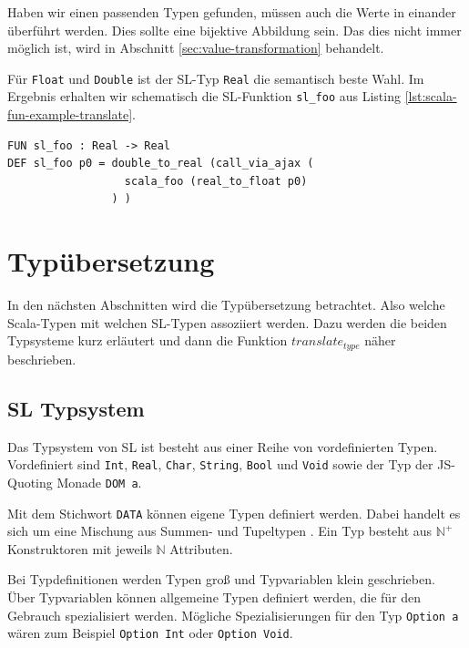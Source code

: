 \documentclass[12pt,bibtotoc]{scrreprt}
\begin{document}
Haben wir einen passenden Typen gefunden, müssen auch die Werte in einander überführt werden. Dies sollte eine bijektive Abbildung sein. Das dies nicht immer möglich ist, wird in Abschnitt \ref{sec:value-transformation} behandelt.

Für \lstinline!Float! und \lstinline!Double! ist der SL-Typ \lstinline!Real! die semantisch beste Wahl. Im Ergebnis erhalten wir schematisch die SL-Funktion \lstinline!sl_foo! aus Listing \ref{lst:scala-fun-example-translate}.

\begin{lstlisting}[caption=Übersetzung von scala\_foo, label=lst:scala-fun-example-translate]
FUN sl_foo : Real -> Real
DEF sl_foo p0 = double_to_real (call_via_ajax (
                  scala_foo (real_to_float p0) 
                ) )
\end{lstlisting}

\section{Typübersetzung}
\label{sec:type-translation}

In den nächsten Abschnitten wird die Typübersetzung betrachtet. Also welche Scala-Typen mit welchen SL-Typen assoziiert werden. Dazu werden die beiden Typsysteme kurz erläutert und dann die Funktion $translate_{type}$ näher beschrieben.

\subsection{SL Typsystem}
\label{subsec:sl-typesystem}

Das Typsystem von SL ist besteht aus einer Reihe von vordefinierten Typen. Vordefiniert sind \lstinline!Int!, \lstinline!Real!, \lstinline!Char!, \lstinline!String!, \lstinline!Bool! und \lstinline!Void! sowie der Typ der JS-Quoting Monade \lstinline!DOM a!.

Mit dem Stichwort \lstinline!DATA! können eigene Typen definiert werden. Dabei handelt es sich um eine Mischung aus Summen- und Tupeltypen \cite[S.119f u. S. 123]{Pepper2007}. Ein Typ besteht aus $\mathbb{N}^+$ Konstruktoren mit jeweils $\mathbb{N}$ Attributen.

Bei Typdefinitionen werden Typen groß und Typvariablen klein geschrieben. Über Typvariablen können allgemeine Typen definiert werden, die für den Gebrauch spezialisiert werden. Mögliche Spezialisierungen für den Typ \lstinline!Option a! wären zum Beispiel \lstinline!Option Int! oder \lstinline!Option Void!.
\end{document}
